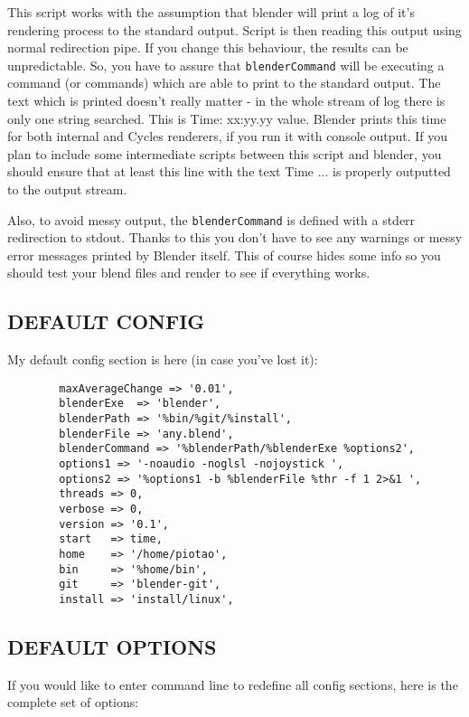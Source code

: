 \documentclass{article}
\begin{document}
This script works with the assumption that blender will print a log of it's
rendering process to the standard output. Script is then reading this output
using normal redirection pipe. If you change this behaviour, the results can be
unpredictable. So, you have to assure that \texttt{blenderCommand} will be executing
a command (or commands) which are able to print to the standard output. The
text which is printed doesn't really matter - in the whole stream of log there
is only one string searched. This is Time: xx:yy.yy value. Blender prints this
time for both internal and Cycles renderers, if you run it with console output.
If you plan to include some intermediate scripts between this script and
blender, you should ensure that at least this line with the text Time ... is
properly outputted to the output stream.



Also, to avoid messy output, the \texttt{blenderCommand} is defined with a stderr
redirection to stdout. Thanks to this you don't have to see any warnings or
messy error messages printed by Blender itself. This of course hides some info
so you should test your blend files and render to see if everything works.

\subsection*{DEFAULT CONFIG\label{DEFAULT_CONFIG}}


My default config section is here (in case you've lost it):

\begin{verbatim}
        maxAverageChange => '0.01',
        blenderExe  => 'blender',
        blenderPath => '%bin/%git/%install',
        blenderFile => 'any.blend',
        blenderCommand => '%blenderPath/%blenderExe %options2',
        options1 => '-noaudio -noglsl -nojoystick ',
        options2 => '%options1 -b %blenderFile %thr -f 1 2>&1 ',
        threads => 0,
        verbose => 0,
        version => '0.1',
        start   => time,
        home    => '/home/piotao',
        bin     => '%home/bin',
        git     => 'blender-git',
        install => 'install/linux',
\end{verbatim}
\subsection*{DEFAULT OPTIONS\label{DEFAULT_OPTIONS}}


If you would like to enter command line to redefine all config sections, here
is the complete set of options:
\end{document}
